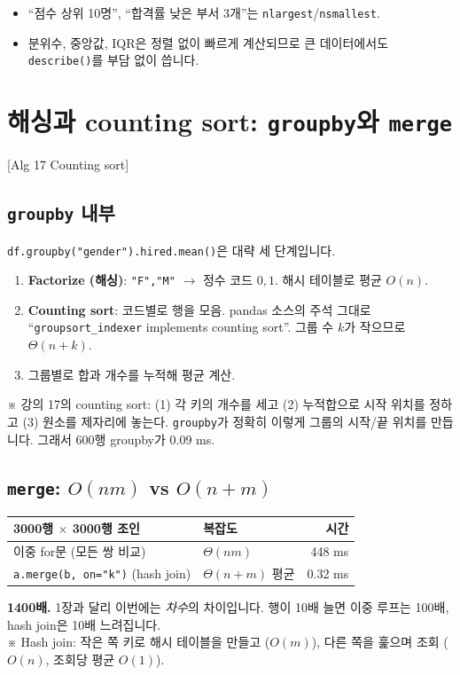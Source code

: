 \documentclass[11pt,a4paper]{article}
\newcommand{\code}[1]{\texttt{#1}}
\newcommand{\aref}[1]{{\footnotesize\textsf{\color{blue!55!black}[Alg #1]}}}
\newcommand{\aside}[1]{{\footnotesize\color{black!65}#1}}
\begin{document}
\begin{dtbox}
\begin{itemize}
\item ``점수 상위 10명'', ``합격률 낮은 부서 3개''는 \code{nlargest}/\code{nsmallest}.
\item 분위수, 중앙값, IQR은 정렬 없이 빠르게 계산되므로 큰 데이터에서도 \code{describe()}를 부담 없이 씁니다.
\end{itemize}
\end{dtbox}

\section{해싱과 counting sort: \code{groupby}와 \code{merge}}
\aref{17 Counting sort}

\subsection{\code{groupby} 내부}
\code{df.groupby("gender").hired.mean()}은 대략 세 단계입니다.
\begin{enumerate}
\item \textbf{Factorize (해싱)}: \code{"F","M"} $\to$ 정수 코드 $0,1$. 해시 테이블로 평균 $O(n)$.
\item \textbf{Counting sort}: 코드별로 행을 모음. pandas 소스의 주석 그대로 ``\code{groupsort\_indexer} implements counting sort''. 그룹 수 $k$가 작으므로 $\Theta(n+k)$.
\item 그룹별로 합과 개수를 누적해 평균 계산.
\end{enumerate}
\aside{※ 강의 17의 counting sort: (1) 각 키의 개수를 세고 (2) 누적합으로 시작 위치를 정하고 (3) 원소를 제자리에 놓는다. \code{groupby}가 정확히 이렇게 그룹의 시작/끝 위치를 만듭니다. 그래서 600행 groupby가 0.09 ms.}

\subsection{\code{merge}: $O(nm)$ vs $O(n+m)$}
\begin{center}
\begin{tabular}{@{}l l r@{}}
\toprule
3000행 $\times$ 3000행 조인 & 복잡도 & 시간 \\
\midrule
이중 for문 (모든 쌍 비교) & $\Theta(nm)$ & 448 ms \\
\code{a.merge(b, on="k")} (hash join) & $\Theta(n+m)$ 평균 & 0.32 ms \\
\bottomrule
\end{tabular}
\end{center}
\textbf{1400배.} 1장과 달리 이번에는 \emph{차수}의 차이입니다. 행이 10배 늘면 이중 루프는 100배, hash join은 10배 느려집니다.\\
\aside{※ Hash join: 작은 쪽 키로 해시 테이블을 만들고 ($O(m)$), 다른 쪽을 훑으며 조회 ($O(n)$, 조회당 평균 $O(1)$).}
\end{document}
